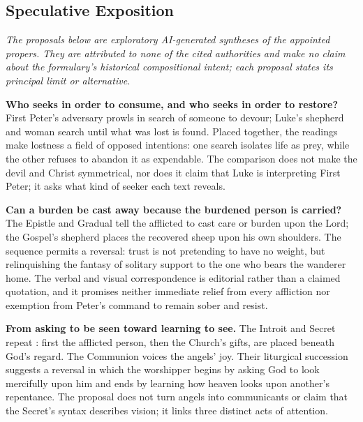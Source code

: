 \begin{deepstudy}
\sectionguard
\section*{Speculative Exposition}

\noindent\emph{The proposals below are exploratory AI-generated syntheses of the appointed propers. They are attributed to none of the cited authorities and make no claim about the formulary's historical compositional intent; each proposal states its principal limit or alternative.}

\noindent\textbf{Who seeks in order to consume, and who seeks in order to restore?\enspace{}}
First Peter's adversary prowls in search of someone to devour; Luke's shepherd and woman search until what was lost is found. Placed together, the readings make lostness a field of opposed intentions: one search isolates life as prey, while the other refuses to abandon it as expendable. The comparison does not make the devil and Christ symmetrical, nor does it claim that Luke is interpreting First Peter; it asks what kind of seeker each text reveals.

\noindent\textbf{Can a burden be cast away because the burdened person is carried?\enspace{}}
The Epistle and Gradual tell the afflicted to cast care or burden upon the Lord; the Gospel's shepherd places the recovered sheep upon his own shoulders. The sequence permits a reversal: trust is not pretending to have no weight, but relinquishing the fantasy of solitary support to the one who bears the wanderer home. The verbal and visual correspondence is editorial rather than a claimed quotation, and it promises neither immediate relief from every affliction nor exemption from Peter's command to remain sober and resist.

\noindent\textbf{From asking to be seen toward learning to see.\enspace{}}
The Introit and Secret repeat : first the afflicted person, then the Church's gifts, are placed beneath God's regard. The Communion voices the angels' joy. Their liturgical succession suggests a reversal in which the worshipper begins by asking God to look mercifully upon him and ends by learning how heaven looks upon another's repentance. The proposal does not turn angels into communicants or claim that the Secret's syntax describes vision; it links three distinct acts of attention.


\end{deepstudy}
